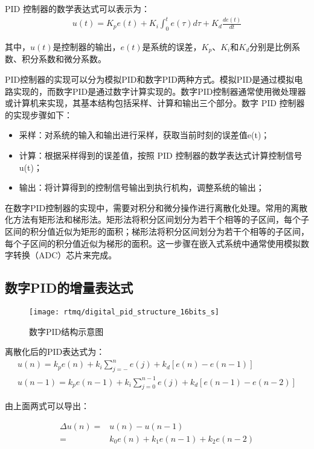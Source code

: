 PID 控制器的数学表达式可以表示为：
\begin{align}
    u(t)= K_p e(t) + K_i \int_{0}^{t} e(\tau) d\tau + K_d \frac{d e(t)}{dt}
\end{align}

其中，$u(t)$是控制器的输出，$e(t)$是系统的误差，$K_p$、$K_i$和$K_d$分别是比例系数、积分系数和微分系数。
 
PID控制器的实现可以分为模拟PID和数字PID两种方式。模拟PID是通过模拟电路实现的，而数字PID是通过数字计算实现的。数字PID控制器通常使用微处理器或计算机来实现，其基本结构包括采样、计算和输出三个部分。数字 PID 控制器的实现步骤如下：
\begin{itemize}
    \item 采样：对系统的输入和输出进行采样，获取当前时刻的误差值e(t)；
    \item 计算：根据采样得到的误差值，按照 PID 控制器的数学表达式计算控制信号u(t)；
    \item 输出：将计算得到的控制信号输出到执行机构，调整系统的输出；
\end{itemize}

在数字PID控制器的实现中，需要对积分和微分操作进行离散化处理。常用的离散化方法有矩形法和梯形法。矩形法将积分区间划分为若干个相等的子区间，每个子区间的积分值近似为矩形的面积；梯形法将积分区间划分为若干个相等的子区间，每个子区间的积分值近似为梯形的面积。这一步骤在嵌入式系统中通常使用模拟数字转换（ADC）芯片来完成。

\subsection[数字PID的增量表达式]{数字PID的增量表达式}
\begin{figure}
    \centering
    \caption[数字PID结构示意图]{数字PID结构示意图\label{fig:digital_pid_structure_16bits_s}}
    \texttt{[image: rtmq/digital\_pid\_structure\_16bits\_s]}
\end{figure}

离散化后的PID表达式为：
\begin{align}
    u(n)=k_p e(n)+k_i\sum_{j=-}^{n}e(j)+k_d[e(n)-e(n-1)]\\
    u(n-1)=k_p e(n-1)+k_i \sum_{j=0}^{n-1}e(j)+k_d [e(n-1)-e(n-2)]
\end{align}

由上面两式可以导出：

\begin{align}
    \Delta u(n)=&u(n)-u(n-1)\\
    =&k_0 e(n)+k_1 e(n-1)+k_2 e(n-2)
\end{align}

